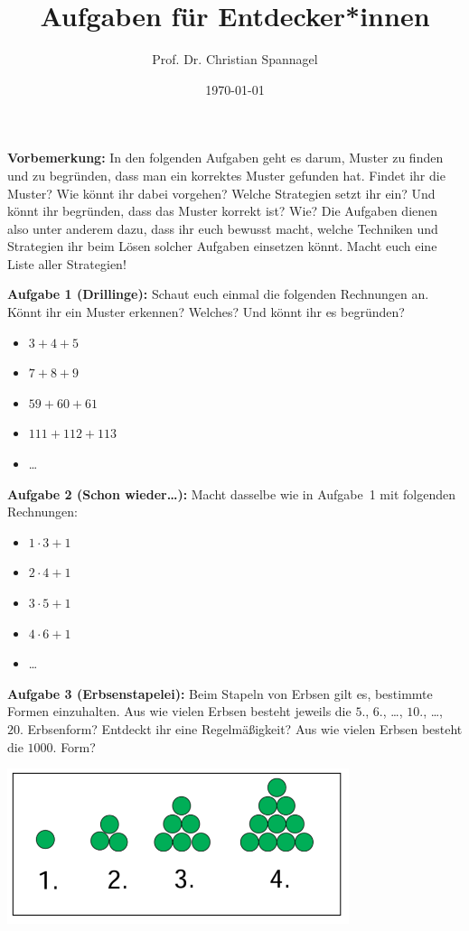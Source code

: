 \documentclass{../cssheet}
\title{Aufgaben für Entdecker*innen}
\author{Prof. Dr. Christian Spannagel}
\date{\today}
\begin{document}
\printtitle

\vspace*{10mm}

\textbf{Vorbemerkung:}  In den folgenden Aufgaben geht es darum, Muster zu finden und zu begründen, dass man ein korrektes Muster gefunden hat. Findet ihr die Muster? Wie könnt ihr dabei vorgehen? Welche Strategien setzt ihr ein? Und könnt ihr begründen, dass das Muster korrekt ist? Wie? Die Aufgaben dienen also unter anderem dazu, dass ihr euch bewusst macht, welche Techniken und Strategien ihr beim Lösen solcher Aufgaben einsetzen könnt. Macht euch eine Liste aller Strategien!


\textbf{Aufgabe 1 (Drillinge):}  Schaut euch einmal die folgenden Rechnungen an. Könnt ihr ein Muster erkennen? Welches? Und könnt ihr es begründen?

\begin{itemize}
\item $3+4+5$
\item $7+8+9$
\item $59+60+61$
\item $111+112+113$
\item \ldots
\end{itemize}

\textbf{Aufgabe 2 (Schon wieder\ldots):} Macht dasselbe wie in Aufgabe~1 mit folgenden Rechnungen:

\begin{itemize}
\item $1\cdot3 + 1$
\item $2\cdot4 + 1$
\item $3\cdot5 + 1$
\item $4\cdot6 + 1$
\item \ldots
\end{itemize}

\textbf{Aufgabe 3 (Erbsenstapelei):} Beim Stapeln von Erbsen gilt es, bestimmte Formen einzuhalten. Aus wie vielen Erbsen besteht jeweils die $5.$, $6.$, …, $10.$, …, $20.$ Erbsenform? Entdeckt ihr eine Regelmäßigkeit? Aus wie vielen Erbsen besteht die $1000.$ Form?

\begin{center}\includegraphics[width=10cm]{erbsen.png}\end{center}

\newpage
\printlicense

\printsocials
\end{document}
